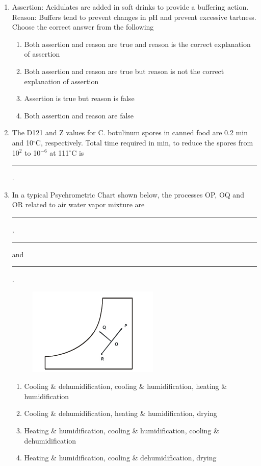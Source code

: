 \documentclass[journal,12pt,onecolumn]{IEEEtran}
\begin{document}
\begin{enumerate}[label=\arabic*.,resume]
\item Assertion: Acidulates are added in soft drinks to provide a buffering action.\\
Reason: Buffers tend to prevent changes in pH and prevent excessive tartness.\\
Choose the correct answer from the following

\begin{enumerate}[label=(\Alph*)]
\item Both assertion and reason are true and reason is the correct explanation of assertion
\item Both assertion and reason are true but reason is not the correct explanation of assertion
\item Assertion is true but reason is false
\item Both assertion and reason are false
\end{enumerate}

\item The D121 and Z values for C. botulinum spores in canned food are 0.2 min and 10$^\circ$C, respectively. Total time required in min, to reduce the spores from 10$^2$ to 10$^{-6}$ at 111$^\circ$C is \rule{2.5cm}{0.1pt}.

\item In a typical Psychrometric Chart shown below, the processes OP, OQ and OR related to air water vapor mixture are \rule{1.5cm}{0.1pt}, \rule{1.5cm}{0.1pt}and \rule{1.5cm}{0.1pt}.

\begin{figure}[H]
\centering
\includegraphics[width=0.7\columnwidth]{FIG/M-16.png}
\caption*{}
\label{fig:M-16}
\end{figure}

\begin{enumerate}[label=(\Alph*)]
\item Cooling \& dehumidification, cooling \& humidification, heating \& humidification
\item Cooling \& dehumidification, heating \& humidification, drying
\item Heating \& humidification, cooling \& humidification, cooling \& dehumidification
\item Heating \& humidification, cooling \& dehumidification, drying
\end{enumerate}


\end{enumerate}
\end{document}
